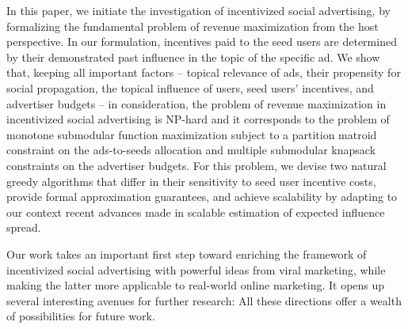\enlargethispage{\baselineskip}

In this paper, we initiate the investigation of incentivized social advertising,
by formalizing the fundamental problem of revenue maximization from the
host perspective. In our formulation, incentives paid to the seed users are determined by
their demonstrated past influence in the topic of the specific ad. We show that,
keeping all important factors -- topical relevance of ads, their propensity for
social propagation, the topical influence of users, seed users' incentives, and advertiser
budgets -- in consideration, the problem of revenue maximization in incentivized
social advertising is NP-hard and it corresponds to the problem of monotone submodular
function maximization subject to a partition matroid constraint on the
ads-to-seeds allocation and multiple submodular knapsack constraints on the advertiser
budgets.
For this problem, we devise two natural greedy algorithms that differ in
their sensitivity to seed user incentive costs, provide
formal approximation guarantees, and achieve scalability by adapting to our context  recent advances made in scalable estimation of expected influence spread.

Our work takes an important first step toward enriching the framework of incentivized
social advertising with powerful ideas from viral marketing, while
making the latter more applicable to real-world online marketing. It opens up several interesting avenues for further research: 
All  these directions  offer a
wealth of possibilities for future work.

%

